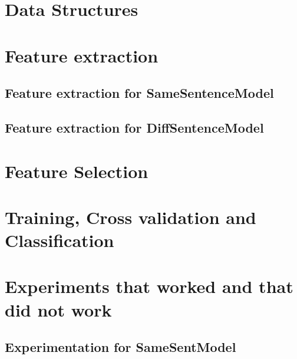 \section{Data Structures} \label{sec:dataStructure}


\section{Feature extraction}\label{sec:featExp}

\subsection{Feature extraction for SameSentenceModel}

\subsection{Feature extraction for DiffSentenceModel}

\section{Feature Selection}\label{sec:featSel}

%
%
%

\section{Training, Cross validation and Classification}\label{sec:training}

\section{Experiments that worked and that did not work}\label{sec:experiments}

\subsection{Experimentation for SameSentModel}

